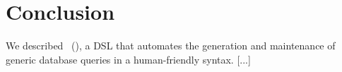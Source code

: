 
\section{Conclusion}
\label{conclusion}

We described \dslfull~(\dsl), a DSL that automates the generation and maintenance of generic database queries in a human-friendly syntax. [...]
 



